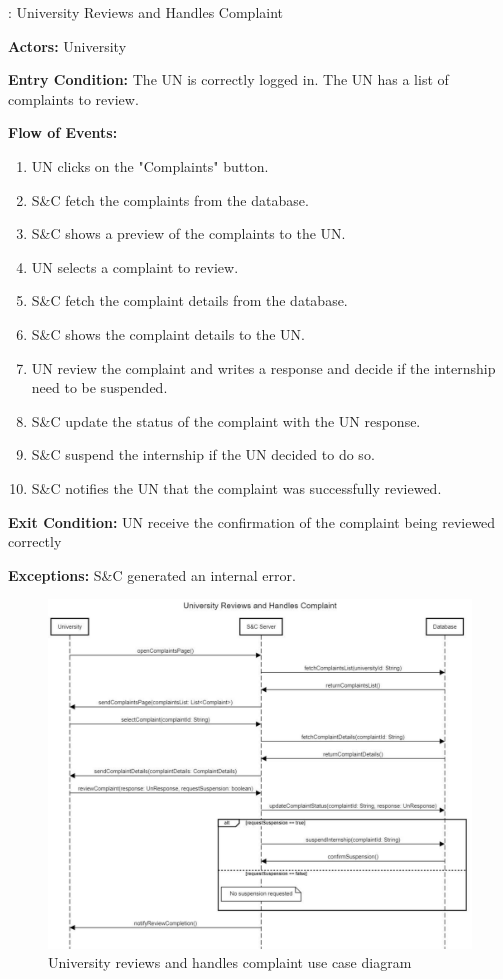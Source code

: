 \nextUseCaseID: University Reviews and Handles Complaint

\par \textbf{Actors:} University

\par \textbf{Entry Condition:} The UN is correctly logged in. The UN has a list of complaints to review.

\par \textbf{Flow of Events:}

\begin{enumerate}
    \item UN clicks on the "Complaints" button.
    \item S\&C fetch the complaints from the database.
    \item S\&C shows a preview of the complaints to the UN.
    \item UN selects a complaint to review.
    \item S\&C fetch the complaint details from the database.
    \item S\&C shows the complaint details to the UN.
    \item UN review the complaint and writes a response and decide if the internship need to be suspended.
    \item S\&C update the status of the complaint with the UN response.
    \item S\&C suspend the internship if the UN decided to do so.
    \item S\&C notifies the UN that the complaint was successfully reviewed.
\end{enumerate}

\par \textbf{Exit Condition:} UN receive the confirmation of the complaint being reviewed correctly

\par \textbf{Exceptions:}  S\&C generated an internal error.


\begin{figure}[H]
    \centering
    \includegraphics[width=1.0\textwidth]{Images/UC_16.pdf}
    \caption{University reviews and handles complaint use case diagram}
    \label{fig:use-case-diagram-16}
\end{figure}

